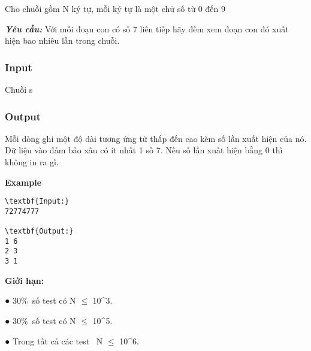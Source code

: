 

Cho chuỗi gồm N ký tự, mỗi ký tự là một chữ số từ 0 đến 9

\textbf{\emph{Yêu cầu: }} Với mỗi đoạn con có số 7 liên tiếp hãy đếm xem đoạn con đó xuất hiện bao nhiêu lần trong chuỗi.

\subsubsection{Input}

Chuỗi s

\subsubsection{Output}

Mỗi dòng ghi một độ dài tương ứng từ thấp đến cao kèm số lần xuất hiện của nó. Dữ liệu vào đảm bảo xâu có ít nhất 1 số 7. Nếu số lần xuất hiện bằng 0 thì không in ra gì.

\textbf{Example }
\begin{verbatim}
\textbf{Input:}
72774777

\textbf{Output:}
1 6
2 3
3 1
\end{verbatim}

\textbf{Giới hạn:}

● 30\% số test có N  $\le$  10\textasciicircum3.

● 30\% số test có N  $\le$  10\textasciicircum5.

● Trong tất cả các test  N  $\le$  10\textasciicircum6.
